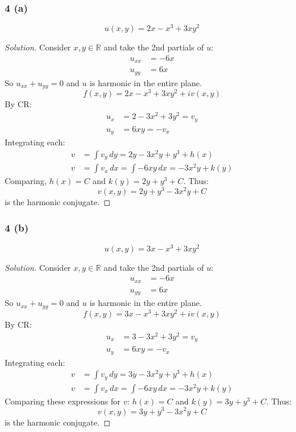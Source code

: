 \documentclass{article}
\newenvironment{solution}{
\begin{proof}[Solution]}{
\end{proof}}
\begin{document}
\subsubsection*{4 (a)}
\[
  u(x, y) = 2x - x^3 + 3xy^2
\]
\begin{solution}
  Consider $x, y \in \mathbb{R}$ and take the 2nd partials of $u$:
  \begin{align*}
    u_{xx} &= -6x
    \\ u_{yy} &= 6x
  \end{align*}
  So $u_{xx} + u_{yy} = 0$ and $u$ is harmonic in the entire plane.
  \[
    f(x, y) = 2x - x^3 + 3xy^2 + iv(x, y)
  \]
  By CR:
  \begin{align*}
    u_x &= 2 - 3x^2 + 3y^2 = v_y
    \\ u_y &= 6xy = -v_x
  \end{align*}
  Integrating each:
  \begin{align*}
    v &= \int v_y \, dy = 2y - 3x^2 y + y^3 + h(x)
    \\ v &= \int v_x \, dx = \int -6xy \, dx = -3x^2 y + k(y)
  \end{align*}
  Comparing, $h(x) = C$ and $k(y) = 2y + y^3 + C$. Thus:
  \[
    v(x, y) = 2y + y^3 - 3x^2 y + C
  \]
  is the harmonic conjugate.
\end{solution}

\subsubsection*{4 (b)}
\[
  u(x, y) = 3x - x^3 + 3xy^2
\]
\begin{solution}
  Consider $x, y \in \mathbb{R}$ and take the 2nd partials of $u$:
  \begin{align*}
    u_{xx} &= -6x
    \\ u_{yy} &= 6x
  \end{align*}
  So $u_{xx} + u_{yy} = 0$ and $u$ is harmonic in the entire plane.
  \[
    f(x, y) = 3x - x^3 + 3xy^2 + iv(x, y)
  \]
  By CR:
  \begin{align*}
    u_x &= 3 - 3x^2 + 3y^2 = v_y
    \\ u_y &= 6xy = -v_x
  \end{align*}
  Integrating each:
  \begin{align*}
    v &= \int v_y \, dy = 3y - 3x^2 y + y^3 + h(x)
    \\ v &= \int v_x \, dx = \int -6xy \, dx = -3x^2 y + k(y)
  \end{align*}
  Comparing these expressions for $v$: $h(x) = C$ and $k(y) = 3y + y^3 + C$.
  Thus:
  \[
    v(x, y) = 3y + y^3 - 3x^2 y + C
  \]
  is the harmonic conjugate.
\end{solution}
\end{document}
